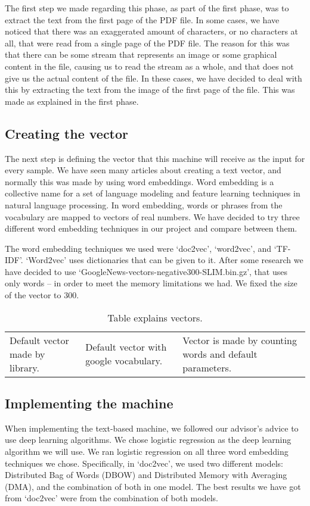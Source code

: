 \documentclass{article}
\begin{document}
\indent The first step we made regarding this phase, as part of the first phase, was to extract the text from the first page of the PDF file. In some cases, we have noticed that there was an exaggerated amount of characters, or no characters at all, that were read from a single page of the PDF file. The reason for this was that there can be some stream that represents an image or some graphical content in the file, causing us to read the stream as a whole, and that does not give us the actual content of the file. In these cases, we have decided to deal with this by extracting the text from the image of the first page of the file. This was made as explained in the first phase.

\subsection{Creating the vector}
\indent The next step is defining the vector that this machine will receive as the input for every sample. We have seen many articles about creating a text vector, and normally this was made by using word embeddings. Word embedding is a collective name for a set of language modeling and feature learning techniques in natural language processing. In word embedding, words or phrases from the vocabulary are mapped to vectors of real numbers. We have decided to try three different word embedding techniques in our project and compare between them. 

\indent The word embedding techniques we used were ‘doc2vec’, ‘word2vec’, and ‘TF-IDF’.  ‘Word2vec’ uses dictionaries that can be given to it. After some research we have decided to use ‘GoogleNews-vectors-negative300-SLIM.bin.gz’, that uses only words – in order to meet the memory limitations we had. We fixed the size of the vector to 300.

\begin{table}[htb]
\centering
\begin{tabular}{|p{3.5cm}|p{3.5cm}|p{3.5cm}|}
\hline
\centering{Doc2Vec} & \centering{Word2Vec} & \centering{TF-IDF}\tabularnewline
\hline
\raggedright{Default vector made by library.} & \raggedright{Default vector with google vocabulary.} & \raggedright{Vector is made by counting words and default parameters.}\tabularnewline
\hline
\end{tabular}
\caption{Table explains vectors.}
\end{table}

\subsection{Implementing the machine}
\indent When implementing the text-based machine, we followed our advisor's advice to use deep learning algorithms. We chose logistic regression as the deep learning algorithm we will use. We ran logistic regression on all three word embedding techniques we chose. Specifically, in ‘doc2vec’, we used two different models: Distributed Bag of Words (DBOW) and Distributed Memory with Averaging (DMA), and the combination of both in one model. The best results we have got from ‘doc2vec’ were from the combination of both models.
\end{document}
